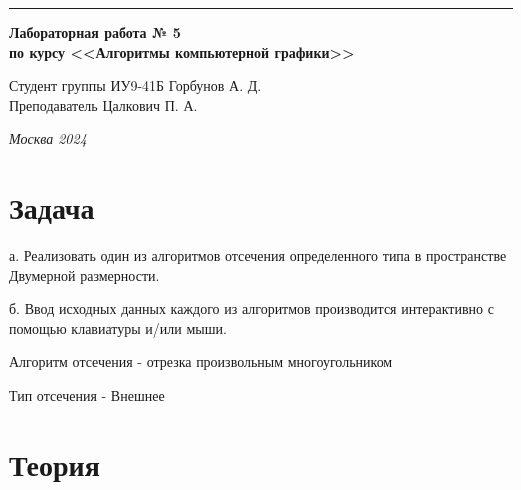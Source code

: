 \documentclass[a4paper, 14pt]{extarticle}
\begin{document}
\begin{titlepage}
\vspace*{-16pt}
\hspace{30pt}\rule{0.866\textwidth}{0.4pt}
  
\vspace{11em}

\begin{center}
\Large {\bf Лабораторная работа № 5} \\ 
\large {\bf по курсу <<Алгоритмы компьютерной графики>>}\\
\end{center}\normalsize

\vspace{8em}


\begin{flushright}
  {Студент группы ИУ9-41Б Горбунов А. Д.\hspace*{15pt} \\
  \vspace{2ex}
  Преподаватель Цалкович П. А.\hspace*{15pt}}
\end{flushright}

\bigskip

\vfill
 

\begin{center}
\textsl{Москва 2024}
\end{center}
\end{titlepage}

\renewcommand{\ttdefault}{pcr}

\setlength{\tabcolsep}{3pt}
\newpage
\setcounter{page}{2}

\section{Задача}\label{Sect::task}
\par
а. Реализовать один из алгоритмов отсечения определенного типа в пространстве Двумерной размерности.

б. Ввод исходных данных каждого из алгоритмов производится интерактивно с помощью клавиатуры и/или мыши.

Алгоритм отсечения - отрезка произвольным многоугольником

Тип отсечения - Внешнее

\section{Теория}\label{Sect::task}
\par
\end{document}
